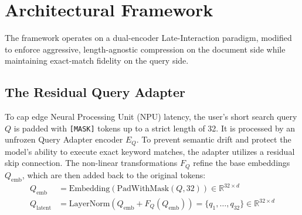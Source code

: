 \documentclass[11pt, a4paper]{article}
\begin{document}
\section{Architectural Framework}
The framework operates on a dual-encoder Late-Interaction paradigm, modified to enforce aggressive, length-agnostic compression on the document side while maintaining exact-match fidelity on the query side.

\subsection{The Residual Query Adapter}
To cap edge Neural Processing Unit (NPU) latency, the user's short search query $Q$ is padded with \texttt{[MASK]} tokens up to a strict length of 32. It is processed by an unfrozen Query Adapter encoder $E_Q$. To prevent semantic drift and protect the model's ability to execute exact keyword matches, the adapter utilizes a residual skip connection. The non-linear transformations $F_Q$ refine the base embeddings $Q_{\text{emb}}$, which are then added back to the original tokens:
\begin{align}
    Q_{\text{emb}} &= \text{Embedding}(\text{PadWithMask}(Q, 32)) \in \mathbb{R}^{32 \times d} \\
    Q_{\text{latent}} &= \text{LayerNorm}\left( Q_{\text{emb}} + F_Q(Q_{\text{emb}}) \right) = \{q_1, \dots, q_{32}\} \in \mathbb{R}^{32 \times d}
\end{align}
\end{document}
